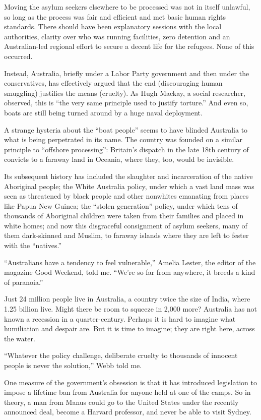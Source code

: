 Moving the asylum seekers elsewhere to be processed was not in itself
unlawful, so long as the process was fair and efficient and met basic
human rights standards. There should have been explanatory sessions with
the local authorities, clarity over who was running facilities, zero
detention and an Australian-led regional effort to secure a decent life
for the refugees. None of this occurred.

Instead, Australia, briefly under a Labor Party government and then
under the conservatives, has effectively argued that the end
(discouraging human smuggling) justifies the means (cruelty). As Hugh
Mackay, a social researcher, observed, this is ``the very same principle
used to justify torture.'' And even so, boats are still being turned
around by a huge naval deployment.

A strange hysteria about the ``boat people'' seems to have blinded
Australia to what is being perpetrated in its name. The country was
founded on a similar principle to ``offshore processing'': Britain's
dispatch in the late 18th century of convicts to a faraway land in
Oceania, where they, too, would be invisible.

Its subsequent history has included the slaughter and incarceration of
the native Aboriginal people; the White Australia policy, under which a
vast land mass was seen as threatened by black people and other
nonwhites emanating from places like Papua New Guinea; the ``stolen
generation'' policy, under which tens of thousands of Aboriginal
children were taken from their families and placed in white homes; and
now this disgraceful consignment of asylum seekers, many of them
dark-skinned and Muslim, to faraway islands where they are left to
fester with the ``natives.''

``Australians have a tendency to feel vulnerable,'' Amelia Lester, the
editor of the magazine Good Weekend, told me. ``We're so far from
anywhere, it breeds a kind of paranoia.''

Just 24 million people live in Australia, a country twice the size of
India, where 1.25 billion live. Might there be room to squeeze in 2,000
more? Australia has not known a recession in a quarter-century. Perhaps
it is hard to imagine what humiliation and despair are. But it is time
to imagine; they are right here, across the water.

``Whatever the policy challenge, deliberate cruelty to thousands of
innocent people is never the solution,'' Webb told me.

One measure of the government's obsession is that it has introduced
legislation to impose a lifetime ban from Australia for anyone held at
one of the camps. So in theory, a man from Manus could go to the United
States under the recently announced deal, become a Harvard professor,
and never be able to visit Sydney.

